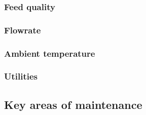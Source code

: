 \subsubsection{Feed quality}

\subsubsection{Flowrate}

\subsubsection{Ambient temperature}

\subsubsection{Utilities}


\subsection{Key areas of maintenance} %